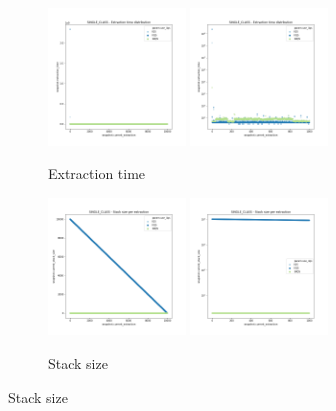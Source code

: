 \begin{figure}
    \begin{subfigure}[b]{\textwidth}
        \centering
        \includegraphics[width=0.40\textwidth]{./fragments/05_workhorse_experiment/images/01_basebenchmark_04_single_class.png.1_0.png}
        \includegraphics[width=0.40\textwidth]{./fragments/05_workhorse_experiment/images/01_basebenchmark_04_single_class.png.1_1.png}
        \caption{Extraction time}
        \label{FIG:WORKHORSE_BENCHMARK_04__0_0}
    \end{subfigure}

    \begin{subfigure}[b]{\textwidth}
        \centering
        \includegraphics[width=0.40\textwidth]{./fragments/05_workhorse_experiment/images/01_basebenchmark_04_single_class.png.2_0.png}
        \includegraphics[width=0.40\textwidth]{./fragments/05_workhorse_experiment/images/01_basebenchmark_04_single_class.png.2_1.png}
        \caption{Stack size}
        \label{FIG:WORKHORSE_BENCHMARK_04__0_0}
    \end{subfigure}
    

\end{figure}
